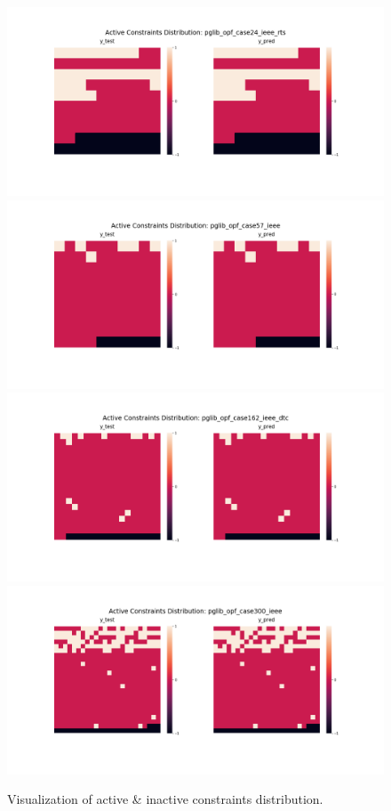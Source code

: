 \documentclass[11pt]{article}
\begin{document}
\begin{figure}[h!]\label{fig:visualization_results}
\centering
\includegraphics[scale=0.253]{codes/experiments/figures/pglib_opf_case24_ieee_rts.png}
\includegraphics[scale=0.253]{codes/experiments/figures/pglib_opf_case57_ieee.png}
\includegraphics[scale=0.253]{codes/experiments/figures/pglib_opf_case162_ieee_dtc.png}
\includegraphics[scale=0.253]{codes/experiments/figures/pglib_opf_case300_ieee.png}
\caption{Visualization of active & inactive constraints distribution.}
\end{figure}
\end{document}
